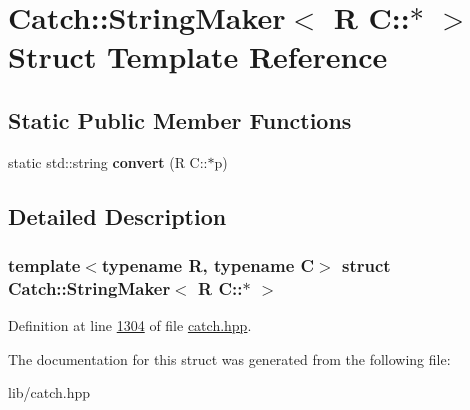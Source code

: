 \hypertarget{structCatch_1_1StringMaker_3_01R_01C_1_1_5_01_4}{}\section{Catch\+::String\+Maker$<$ R C\+::$\ast$ $>$ Struct Template Reference}
\label{structCatch_1_1StringMaker_3_01R_01C_1_1_5_01_4}
\subsection*{Static Public Member Functions}
\begin{DoxyCompactItemize}
\item 
\mbox{\label{structCatch_1_1StringMaker_3_01R_01C_1_1_5_01_4_af69c15e0b406e945777137fe4a333731}} 
static std\+::string {\bfseries convert} (R C\+::$\ast$p)
\end{DoxyCompactItemize}


\subsection{Detailed Description}
\subsubsection*{template$<$typename R, typename C$>$\newline
struct Catch\+::\+String\+Maker$<$ R C\+::$\ast$ $>$}



Definition at line \mbox{\hyperlink{catch_8hpp_source_l01304}{1304}} of file \mbox{\hyperlink{catch_8hpp_source}{catch.\+hpp}}.



The documentation for this struct was generated from the following file\+:\begin{DoxyCompactItemize}
\item 
lib/catch.\+hpp\end{DoxyCompactItemize}
